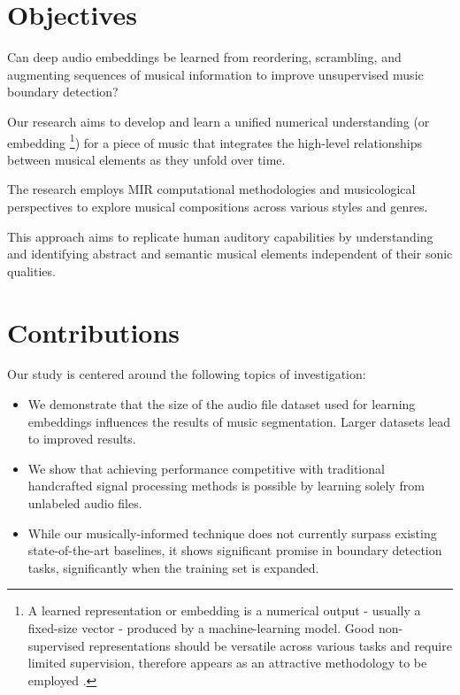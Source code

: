 \section{Objectives}

Can deep audio embeddings be learned from reordering, scrambling, and augmenting sequences of musical information to improve unsupervised music boundary detection?

Our research aims to develop and learn a unified numerical understanding (or embedding \footnote{A learned representation or embedding is a numerical output - usually a fixed-size vector - produced by a machine-learning model. Good non-supervised representations should be versatile across various tasks and require limited supervision, therefore appears as an attractive methodology to be employed \cite{Turian2022HEAR:Representations}.}) for a piece of music that integrates the high-level relationships between musical elements as they unfold over time.

The research employs MIR computational methodologies and musicological perspectives to explore musical compositions across various styles and genres.

This approach aims to replicate human auditory capabilities by understanding and identifying abstract and semantic musical elements independent of their sonic qualities.

\section{Contributions}

Our study is centered around the following topics of investigation:

\begin{itemize}
    \item We demonstrate that the size of the audio file dataset used for learning embeddings influences the results of music segmentation. Larger datasets lead to improved results.
    \item We show that achieving performance competitive with traditional handcrafted signal processing methods is possible by learning solely from unlabeled audio files.
    \item While our musically-informed technique does not currently surpass existing state-of-the-art baselines, it shows significant promise in boundary detection tasks, significantly when the training set is expanded.
\end{itemize}